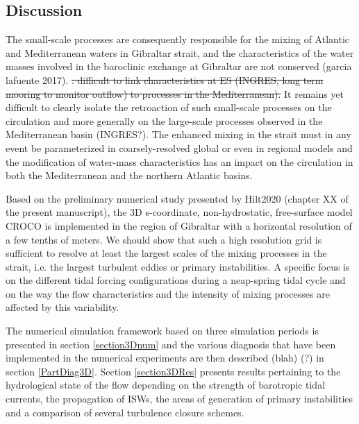 \subsection{Discussion}

The small-scale processes are consequently responsible for the mixing of Atlantic and Mediterranean waters in Gibraltar strait, and the characteristics of the water masses involved in the baroclinic exchange at Gibraltar are not conserved (garcia lafuente 2017). \color{blue} \sout{: difficult to link characteristics at ES (INGRES, long term mooring to monitor outflow) to processes in the Mediterranean).} It remains yet difficult to clearly isolate the retroaction of such small-scale processes on the circulation and more generally on the large-scale processes observed in the Mediterranean basin  (INGRES?). \color{black}
The enhanced mixing in the strait must in any event be \color{black}parameterized in coarsely-resolved global or even in regional models and the modification of water-mass characteristics \color{black} has an impact on the circulation in both the Mediterranean and the northern Atlantic basins. 


Based on the preliminary numerical study presented by Hilt2020 \color{blue}(chapter XX of the present manuscript), the 3D s-coordinate, non-hydrostatic, free-surface model CROCO is implemented in the region of Gibraltar with a horizontal resolution of a few tenths of meters. We should show that such a high resolution grid is sufficient to resolve at least the largest scales of the mixing processes in the strait, i.e. the largest turbulent eddies or primary instabilities. A specific focus is on the \color{black} different tidal forcing configurations during a neap-spring tidal cycle \color{blue} and on the way the flow characteristics and the intensity of mixing processes are affected by this variability. \color{black}


The numerical simulation framework \color{blue} based on three simulation periods is presented in section \ref{section3Dnum} and the various diagnosis that have been implemented in the numerical experiments are then described (blah) (?) in section \ref{PartDiag3D}. Section \ref{section3DRes} presents results pertaining to the hydrological state of the flow depending on the strength of barotropic tidal currents, the propagation of ISWs, the areas of generation of primary instabilities and a comparison of several turbulence closure schemes.\color{black}






